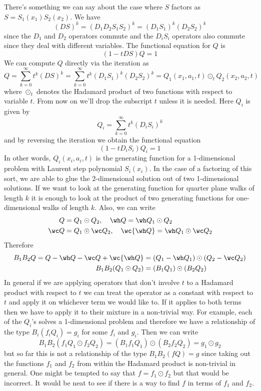 There's something we can say about the case where $S$ factors as $S = S_1(x_1)S_2(x_2)$. We have
\[
	 (DS)^k = (D_1D_2S_1S_2)^k = (D_1S_1)^k(D_2S_2)^k
\]
since the $D_1$ and $D_2$ operators commute and the $D_iS_i$ operators also commute since they deal with different variables. The functional equation for $Q$ is
\[
	(1-tDS)Q = 1
\]
We can compute $Q$ directly via the iteration as 
\[
	Q = \sum_{k = 0}^{\infty} t^k (DS)^k = \sum_{k = 0}^{\infty} t^k (D_1S_1)^k(D_2S_2)^k = Q_1(x_1, a_1,t) \odot_t Q_2(x_2,a_2,t)
\]
where $\odot_t$ denotes the Hadamard product of two functions with respect to variable $t$. From now on we'll drop the subscript $t$ unless it is needed. Here $Q_i$ is given by
\[
	Q_i = \sum_{k = 0}^{\infty} t^k (D_iS_i)^k
\]
and by reversing the iteration we obtain the functional equation
\[
	(1-tD_iS_i)Q_i = 1
\]
In other words, $Q_i(x_i,a_i,t)$ is the generating function for a 1-dimensional problem with Laurent step polynomial $S_i(x_i)$. In the case of a factoring of this sort, we are able to glue the 2-dimensional solution out of two 1-dimensional solutions. If we want to look at the generating function for quarter plane walks of length $k$ it is enough to look at the product of two generating functions for one-dimensional walks of length $k$. Also, we can write
\begin{align*}
	Q &= Q_1 \odot Q_2, \quad \wh Q = \wh Q_1 \odot Q_2\\
	\wc Q &= Q_1 \odot \wc Q_2, \quad \wc{\wh Q}  = \wh Q_1 \odot \wc Q_2
\end{align*}
Therefore
\begin{align*}
	B_1 B_2 Q = Q-\wh Q -\wc Q + \wc{\wh Q} &= (Q_1 - \wh Q_1)\odot (Q_2 - \wc Q_2) \\
	B_1B_2(Q_1\odot Q_2) &=( B_1 Q_1) \odot ( B_2 Q_2)
\end{align*}
In general if we are applying operators that don't involve $t$ to a Hadamard product with respect to $t$ we can treat the operator as a constant with respect to $t$ and apply it on whichever term we would like to. If it applies to both terms then we have to apply it to their mixture in a non-trivial way. For example, each of the $Q_i$'s solves a 1-dimensional problem and therefore we have a relationship of the type $B_i (f_i Q_i) = g_i$ for some $f_i$ and $g_i$. Then we can write
\[
	B_1 B_2 (f_1 Q_1 \odot f_2 Q_2) = ( B_1 f_1 Q_1) \odot ( B_2 f_2 Q_2) = g_1 \odot g_2
\]
but so far this is not a relationship of the type $B_1B_2 (fQ) = g$ since taking out the functions $f_1$ and $f_2$ from within the Hadamard product is non-trivial in general. One might be tempted to say that $f = f_1 \odot f_2$ but that would be incorrect. It would be neat to see if there is a way to find $f$ in terms of $f_1$ and $f_2$.

